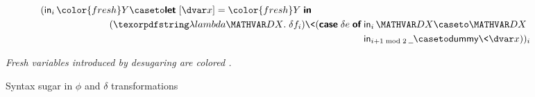 \begin{figure}
\begin{align*}
    &\qquad
    (
    \inj i {\color{fresh}\mvar y} \caseto
    \eletbox{x}{\color{fresh}\mvar y}
    \\
    &\qquad\phantom{(\inj i {\mvar y} \caseto {}}
    (\efn{\dx} \delta f_i)
    \<(\emcase{\delta e}
    \inj i \mvar\dx \caseto \mvar\dx
    \\
    &\qquad\phantom{(\inj i {\mvar y} \caseto {} (\efn{\dx} \delta f_i) \<(\emcase{\delta e}}
    \inj{i+1 \bmod 2} \pwild \caseto \dummy\<\dvar x
    ))_i
  \end{align*}

  \centering\itshape
  Fresh variables introduced by desugaring are colored {\color{fresh}\freshname}.

  \caption{Syntax sugar in $\phi$ and $\delta$ transformations}
  \label{appendix-seminaive-syntax-sugar}
\end{figure}
